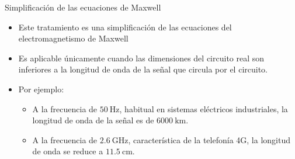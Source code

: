 \documentclass[aspectratio=169, usenames,svgnames,dvipsnames]{beamer}
\begin{document}
\begin{frame}[label={sec:org65c8c5e}]{Simplificación de las ecuaciones de Maxwell}
\begin{itemize}
\item Este tratamiento es una simplificación de las ecuaciones del electromagnetismo de Maxwell
\item Es aplicable únicamente cuando las dimensiones del circuito real son inferiores a la longitud de onda de la señal que circula por el circuito.
\item Por ejemplo:
\begin{itemize}
\item A la frecuencia de \(\SI{50}{\hertz}\), habitual en sistemas eléctricos industriales, la longitud de onda de la señal es de \(\SI{6000}{\kilo\meter}\).
\item A la frecuencia de \(\SI{2.6}{\giga\hertz}\), característica de la telefonía 4G, la longitud de onda se reduce a \(\SI{11.5}{\centi\meter}\).
\end{itemize}
\end{itemize}
\end{frame}
\end{document}
